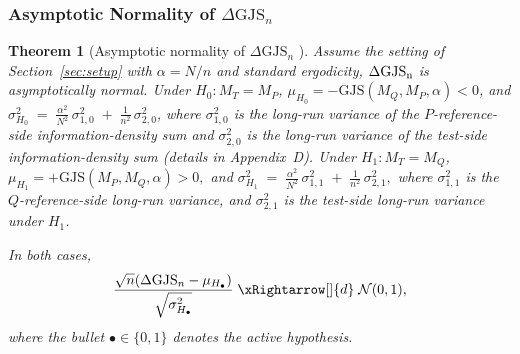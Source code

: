 \documentclass{article}
\theoremstyle{plain}
\newtheorem{theorem}{Theorem}[section]
\theoremstyle{definition}
\theoremstyle{remark}
\begin{document}
\subsubsection{Asymptotic Normality of $\Delta\mathrm{GJS}_n$} \label{sec:proof-asymp-gaussian}
\begin{theorem}[Asymptotic normality of $\Delta\mathrm{GJS}_n$ ]\label{thm:asymptotic-normality}
Assume the setting of Section~\ref{sec:setup} with $\alpha=N/n$ and standard ergodicity, $\Delta \rm{GJS}_n$ is asymptotically normal. Under $H_0: M_T=M_P$,
$\mu_{H_0}=-\mathrm{GJS}(M_Q,M_P,\alpha)<0$,
and
$
\sigma_{H_0}^2 \;=\; \frac{\alpha^2}{N^2}\,\sigma_{1,0}^2 \;+\; \frac{1}{n^2}\,\sigma_{2,0}^2$,
where $\sigma_{1,0}^2$ is the long-run variance of the $P$-reference-side information-density sum and
$\sigma_{2,0}^2$ is the long-run variance of the test-side information-density sum (details in Appendix~D).
Under $H_1: M_T=M_Q$, 
$
\mu_{H_1}=+\mathrm{GJS}(M_P,M_Q,\alpha)>0,
$
and
$
\sigma_{H_1}^2 \;=\; \frac{\alpha^2}{N^2}\,\sigma_{1,1}^2 \;+\; \frac{1}{n^2}\,\sigma_{2,1}^2,
$
where $\sigma_{1,1}^2$ is the $Q$-reference-side long-run variance, and $\sigma_{2,1}^2$ is the test-side long-run variance under $H_1$. 

In both cases,
\[
\frac{\sqrt{n}(\Delta\mathrm{GJS}_n-\mu_{H_\bullet})}{\sqrt{\sigma^2_{H_\bullet}}}
\;\xRightarrow[]{d}\; \mathcal{N}(0,1),
\]
where the bullet $\bullet\in\{0,1\}$ denotes the active hypothesis. 
\end{theorem}
\end{document}
